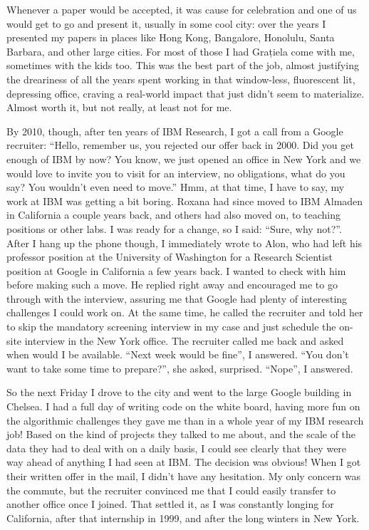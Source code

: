 \documentclass[12pt]{book}
\begin{document}
Whenever a paper would be accepted, it was cause for celebration and one
of us would get to go and present it, usually in some cool city: over
the years I presented my papers in places like Hong Kong, Bangalore,
Honolulu, Santa Barbara, and other large cities. For most of those I had
Grațiela come with me, sometimes with the kids too. This was the best
part of the job, almost justifying the dreariness of all the years spent
working in that window-less, fluorescent lit, depressing office, craving
a real-world impact that just didn't seem to materialize. Almost worth
it, but not really, at least not for me.

By 2010, though, after ten years of IBM Research, I got a call from a
Google recruiter: ``Hello, remember us, you rejected our offer back in
2000. Did you get enough of IBM by now? You know, we just opened an
office in New York and we would love to invite you to visit for an
interview, no obligations, what do you say? You wouldn't even need to
move.'' Hmm, at that time, I have to say, my work at IBM was getting a
bit boring. Roxana had since moved to IBM Almaden in California a couple
years back, and others had also moved on, to teaching positions or other
labs. I was ready for a change, so I said: ``Sure, why not?''. After I
hang up the phone though, I immediately wrote to Alon, who had left his
professor position at the University of Washington for a Research
Scientist position at Google in California a few years back. I wanted to
check with him before making such a move. He replied right away and
encouraged me to go through with the interview, assuring me that Google
had plenty of interesting challenges I could work on. At the same time,
he called the recruiter and told her to skip the mandatory screening
interview in my case and just schedule the on-site interview in the New
York office. The recruiter called me back and asked when would I be
available. ``Next week would be fine'', I answered. ``You don't want to
take some time to prepare?'', she asked, surprised. ``Nope'', I
answered.

So the next Friday I drove to the city and went to the large Google
building in Chelsea. I had a full day of writing code on the white
board, having more fun on the algorithmic challenges they gave me than
in a whole year of my IBM research job! Based on the kind of projects
they talked to me about, and the scale of the data they had to deal with
on a daily basis, I could see clearly that they were way ahead of
anything I had seen at IBM. The decision was obvious! When I got their
written offer in the mail, I didn't have any hesitation. My only concern
was the commute, but the recruiter convinced me that I could easily
transfer to another office once I joined. That settled it, as I was
constantly longing for California, after that internship in 1999, and
after the long winters in New York.
\end{document}
